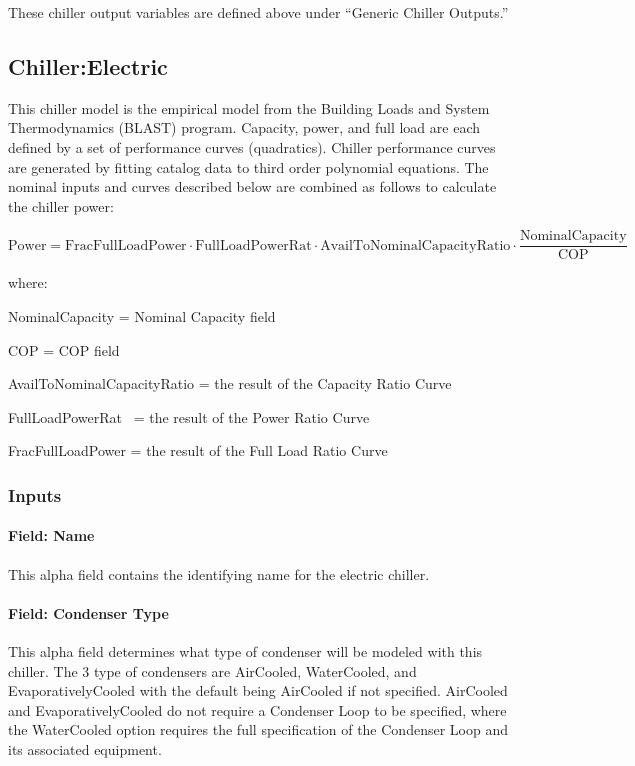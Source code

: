 These chiller output variables are defined above under ``Generic Chiller Outputs.''

\subsection{Chiller:Electric}\label{chillerelectric}

This chiller model is the empirical model from the Building Loads and System Thermodynamics (BLAST) program. Capacity, power, and full load are each defined by a set of performance curves (quadratics). Chiller performance curves are generated by fitting catalog data to third order polynomial equations. The nominal inputs and curves described below are combined as follows to calculate the chiller power:

\begin{equation}
{\mathrm{Power  =  FracFullLoadPower }}
    \cdot {\mathrm{ FullLoadPowerRat }}\cdot {\mathrm{ AvailToNominalCapacityRatio }}\cdot \frac{{{\mathrm{NominalCapacity}}}}{{{\mathrm{COP}}}}
\end{equation}

where:

NominalCapacity = Nominal Capacity field

COP = COP field

AvailToNominalCapacityRatio = the result of the Capacity Ratio Curve

FullLoadPowerRat~ = the result of the Power Ratio Curve

FracFullLoadPower = the result of the Full Load Ratio Curve

\subsubsection{Inputs}\label{inputs-3-026}

\paragraph{Field: Name}\label{field-name-3-023}

This alpha field contains the identifying name for the electric chiller.

\paragraph{Field: Condenser Type}\label{field-condenser-type-1-001}

This alpha field determines what type of condenser will be modeled with this chiller. The 3 type of condensers are AirCooled, WaterCooled, and EvaporativelyCooled with the default being AirCooled if not specified. AirCooled and EvaporativelyCooled do not require a Condenser Loop to be specified, where the WaterCooled option requires the full specification of the Condenser Loop and its associated equipment.

